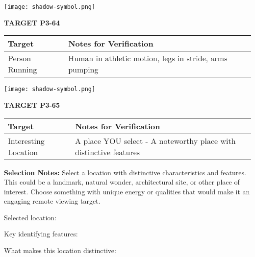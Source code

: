\documentclass[10pt,twoside,final]{book} %
\makeatletter
\newcommand{\cleardoublepageWithSymbol}{%
  \clearpage %
  \if@twoside %
    \ifodd\c@page %
    \else %
      \thispagestyle{fancy} %
      \begingroup %
        \vspace*{0pt} %
        \vfill %
        \centering %
        \noindent 
        \texttt{[image: shadow-symbol.png]}
        \vfill %
      \endgroup
      \newpage    %
      \if@twocolumn\if@firstcolumn\else\hbox{}\newpage\fi\fi
    \fi
  \fi
}
\makeatother
\begin{document}
\cleardoublepageWithSymbol
\label{target:P3-64}
\begin{center}
\Large\textbf{TARGET P3-64}
\end{center}
\begin{mdframed}[backgroundcolor=white, linewidth=0.7pt, linecolor=rvprimary, shadow=true, shadowsize=1pt, shadowcolor=graydark!40, roundcorner=3pt]
\begin{tabular}{|p{3.5cm}|p{9cm}|}
\hline
\rowcolor{rvprimary!15}
\textbf{Target} & \textbf{Notes for Verification} \\
\hline
Person Running & Human in athletic motion, legs in stride, arms pumping \\
\hline
\end{tabular}
\end{mdframed}

\cleardoublepageWithSymbol

\label{target:P3-65}
\begin{center}
\Large\textbf{TARGET P3-65}
\end{center}
\begin{mdframed}[backgroundcolor=white, linewidth=0.7pt, linecolor=rvprimary, shadow=true, shadowsize=1pt, shadowcolor=graydark!40, roundcorner=3pt]
\begin{tabular}{|p{3.5cm}|p{9cm}|}
\hline
\rowcolor{rvprimary!15}
\textbf{Target} & \textbf{Notes for Verification} \\
\hline
Interesting Location & A place YOU select - A noteworthy place with distinctive features \\
\hline
\end{tabular}

\vspace{0.3cm}
\textbf{Selection Notes:} Select a location with distinctive characteristics and features. This could be a landmark, natural wonder, architectural site, or other place of interest. Choose something with unique energy or qualities that would make it an engaging remote viewing target.

\vspace{0.2cm}
Selected location: \\ \rule{0pt}{1in}

\vspace{0.2cm}
Key identifying features: \\ \rule{0pt}{1in}

\vspace{0.2cm}
What makes this location distinctive:\\
\rule{0pt}{1in}
\end{mdframed}
\end{document}
